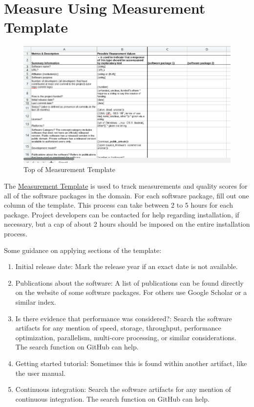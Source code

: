 \documentclass[letterpaper,cleveref]{lipics-v2019}
\theoremstyle{definition}
\begin{document}
\section{Measure Using Measurement Template} \label{SecShallowMeasure}

\begin{figure}[h!]
  \begin{center}
    \includegraphics[width=1.0\textwidth]{measurement_template}
    \caption{Top of Measurement Template}
    \label{measurement_template_image}
  \end{center}
\end{figure}

The
\href{https://github.com/smiths/AIMSS/blob/master/StateOfPractice/Methodology/Combined_MeasurementTemplate_EmpiricalMeasures.xlsx}
{Measurement Template} is used to track measurements and quality scores for all
of the software packages in the domain. For each software package, fill out one
column of the template. This process can take between 2 to 5 hours for each
package.  Project developers can be contacted for help regarding installation,
if necessary, but a cap of about 2 hours should be imposed on the entire
installation process.

Some guidance on applying sections of the template:

\begin{enumerate}
\item Initial release date: Mark the release year if an exact date is not
  available.
\item Publications about the software: A list of publications can be found
  directly on the website of some software packages. For others use Google
  Scholar or a similar index.
\item Is there evidence that performance was considered?: Search the software
  artifacts for any mention of speed, storage, throughput, performance
  optimization, parallelism, multi-core processing, or similar
  considerations. The search function on GitHub can help.
\item Getting started tutorial: Sometimes this is found within another artifact,
  like the user manual.
\item Continuous integration: Search the software artifacts for any mention of
  continuous integration. The search function on GitHub can help.
\end{enumerate}
\end{document}
